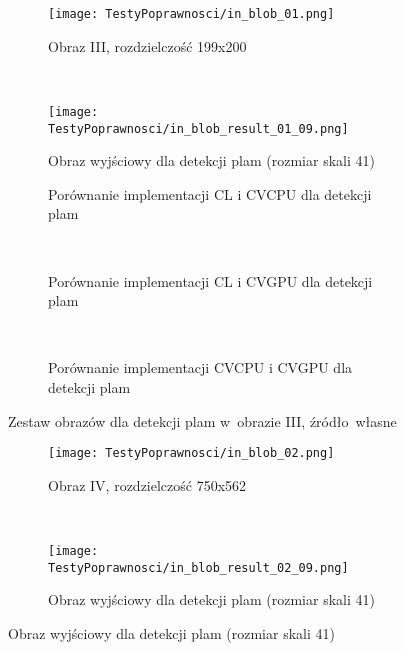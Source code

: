 \begin{itemize}
\begin{figure}[H]

\begin{center}
\begin{subfigure}[t]{0.3\textwidth}
\texttt{[image: TestyPoprawnosci/in\_blob\_01.png]}
\caption{Obraz III, rozdzielczość 199x200}
\label{fig:valBlob01}
\end{subfigure}
~
\begin{subfigure}[t]{0.3\textwidth}
\texttt{[image: TestyPoprawnosci/in\_blob\_result\_01\_09.png]}
\caption{Obraz wyjściowy dla detekcji plam (rozmiar skali 41)}
\label{fig:valBlobResult01}
\end{subfigure}
\end{center}


\begin{subfigure}[t]{0.3\textwidth}
	\centering
	\setlength\fboxsep{0pt}
	\setlength\fboxrule{0.5pt}
	\caption{Porównanie implementacji CL i CVCPU dla detekcji plam}
	\label{fig:valBlob2CLCVCPU}
\end{subfigure}
~
\begin{subfigure}[t]{0.3\textwidth}
	\centering
	\setlength\fboxsep{0pt}
	\setlength\fboxrule{0.5pt}
	\caption{Porównanie implementacji CL i CVGPU dla detekcji plam}
	\label{fig:valBlob2CLCVGPU}
\end{subfigure}
~
\begin{subfigure}[t]{0.3\textwidth}
	\centering
	\setlength\fboxsep{0pt}
	\setlength\fboxrule{0.5pt}
	\caption{Porównanie implementacji CVCPU i CVGPU dla detekcji plam}
	\label{fig:valblob2CVCPUCVGPU}                 
\end{subfigure}
\caption{Zestaw obrazów dla detekcji plam w~obrazie III, \tiny{źródło~własne}}

\label{fig:valBlob1}
\end{figure}

\begin{figure}[H]
\begin{center}
\begin{subfigure}[t]{0.3\textwidth}
\texttt{[image: TestyPoprawnosci/in\_blob\_02.png]}
\caption{Obraz IV, rozdzielczość 750x562}
\label{fig:valBlob02}
\end{subfigure}
~
\begin{subfigure}[t]{0.3\textwidth}
\texttt{[image: TestyPoprawnosci/in\_blob\_result\_02\_09.png]}
\caption{Obraz wyjściowy dla detekcji plam (rozmiar skali 41)}
\label{fig:valBlobResult02}
\end{subfigure}
\end{center}



\end{figure}
\end{itemize}
